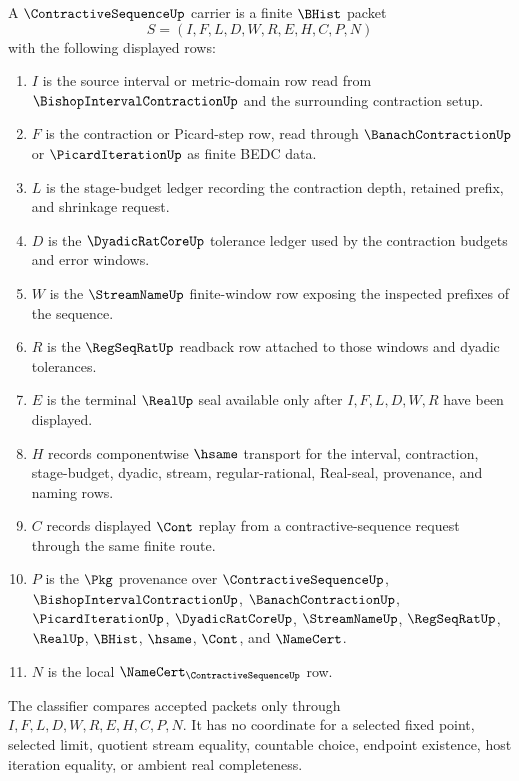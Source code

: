 \begin{definition}
\label{def:contractive-sequence-carrier}
A $\ContractiveSequenceUp$ carrier is a finite $\BHist$ packet
$$
S=(I,F,L,D,W,R,E,H,C,P,N)
$$
with the following displayed rows:
\begin{enumerate}
\item $I$ is the source interval or metric-domain row read from $\BishopIntervalContractionUp$ and the surrounding contraction setup.
\item $F$ is the contraction or Picard-step row, read through $\BanachContractionUp$ or $\PicardIterationUp$ as finite BEDC data.
\item $L$ is the stage-budget ledger recording the contraction depth, retained prefix, and shrinkage request.
\item $D$ is the $\DyadicRatCoreUp$ tolerance ledger used by the contraction budgets and error windows.
\item $W$ is the $\StreamNameUp$ finite-window row exposing the inspected prefixes of the sequence.
\item $R$ is the $\RegSeqRatUp$ readback row attached to those windows and dyadic tolerances.
\item $E$ is the terminal $\RealUp$ seal available only after $I,F,L,D,W,R$ have been displayed.
\item $H$ records componentwise $\hsame$ transport for the interval, contraction, stage-budget, dyadic, stream, regular-rational, Real-seal, provenance, and naming rows.
\item $C$ records displayed $\Cont$ replay from a contractive-sequence request through the same finite route.
\item $P$ is the $\Pkg$ provenance over $\ContractiveSequenceUp$, $\BishopIntervalContractionUp$, $\BanachContractionUp$, $\PicardIterationUp$, $\DyadicRatCoreUp$, $\StreamNameUp$, $\RegSeqRatUp$, $\RealUp$, $\BHist$, $\hsame$, $\Cont$, and $\NameCert$.
\item $N$ is the local $\NameCert_{\ContractiveSequenceUp}$ row.
\end{enumerate}
The classifier compares accepted packets only through $I,F,L,D,W,R,E,H,C,P,N$. It has no coordinate for a selected fixed point, selected limit, quotient stream equality, countable choice, endpoint existence, host iteration equality, or ambient real completeness.
\end{definition}

